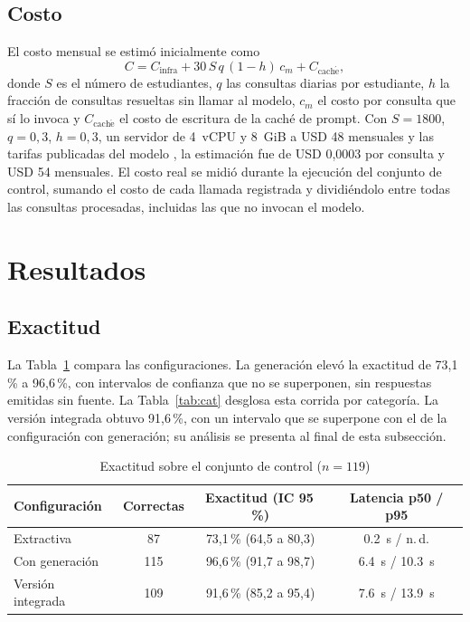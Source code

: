 \documentclass[conference]{IEEEtran}
\begin{document}
\subsection{Costo}
El costo mensual se estimó inicialmente como
\begin{equation}
C = C_{\mathrm{infra}} + 30\,S\,q\,(1-h)\,c_m + C_{\mathrm{cach\acute{e}}},
\label{eq:cost}
\end{equation}
donde $S$ es el número de estudiantes, $q$ las consultas diarias por estudiante, $h$ la fracción de consultas resueltas sin llamar al modelo, $c_m$ el costo por consulta que sí lo invoca y $C_{\mathrm{cach\acute{e}}}$ el costo de escritura de la caché de prompt. Con $S=1800$, $q=0{,}3$, $h=0{,}3$, un servidor de 4~vCPU y 8~GiB a USD 48 mensuales \cite{infra} y las tarifas publicadas del modelo \cite{pricing}, la estimación fue de USD 0,0003 por consulta y USD 54 mensuales. El costo real se midió durante la ejecución del conjunto de control, sumando el costo de cada llamada registrada y dividiéndolo entre todas las consultas procesadas, incluidas las que no invocan el modelo.

\section{Resultados}
\label{sec:results}

\subsection{Exactitud}
La Tabla~\ref{tab:acc} compara las configuraciones. La generación elevó la exactitud de 73,1\,\% a 96,6\,\%, con intervalos de confianza que no se superponen, sin respuestas emitidas sin fuente. La Tabla~\ref{tab:cat} desglosa esta corrida por categoría. La versión integrada obtuvo 91,6\,\%, con un intervalo que se superpone con el de la configuración con generación; su análisis se presenta al final de esta subsección.

\begin{table}[t]
\caption{Exactitud sobre el conjunto de control ($n=119$)}
\label{tab:acc}
\centering
\begin{tabular}{@{}lccc@{}}
\toprule
Configuración & Correctas & Exactitud (IC 95\,\%) & Latencia p50 / p95 \\
\midrule
Extractiva & 87 & 73,1\,\% (64,5 a 80,3) & \SI{0,2}{s} / n.\,d. \\
Con generación & 115 & 96,6\,\% (91,7 a 98,7) & \SI{6,4}{s} / \SI{10,3}{s} \\
Versión integrada & 109 & 91,6\,\% (85,2 a 95,4) & \SI{7,6}{s} / \SI{13,9}{s} \\
\bottomrule
\end{tabular}
\end{table}
\end{document}
